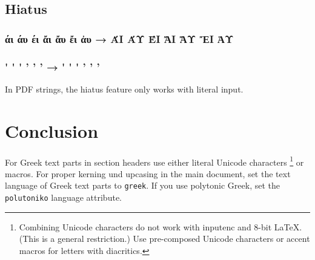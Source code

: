 \documentclass{article}
\newcommand*{\TestUppercase}[1]{#1 → \MakeUppercase{#1}}
\begin{document}
  \subsubsection{\MakeUppercase{\GreekExtendedXVI}}

  \subsection{Hiatus}
  \subsubsection{\TestUppercase{άι άυ έι ἄι ἄυ ἔι ἀυ}}
  \subsubsection{\TestUppercase{\'\textalpha\textiota{}
     \'\textalpha\textupsilon{}  \'\textepsilon\textiota{}
     \>'\textalpha\textiota{}    \>'\textalpha\textupsilon{}
     \>'\textepsilon\textiota{}  \>\textalpha\textupsilon{}
  }}

\fi


In PDF strings, the hiatus feature only works with literal input.

\section{Conclusion}

For Greek text parts in section headers use either literal Unicode characters%
  \footnote{Combining Unicode characters do not work
  with inputenc and 8-bit LaTeX. (This is a general restriction.)
  Use pre-composed Unicode characters or accent macros
  for letters with diacritics. }
or macros. For proper kerning und upcasing in the main document, set the
text language of Greek text parts to \texttt{greek}. If you use polytonic
Greek, set the \texttt{polutoniko} language attribute.
\end{document}
